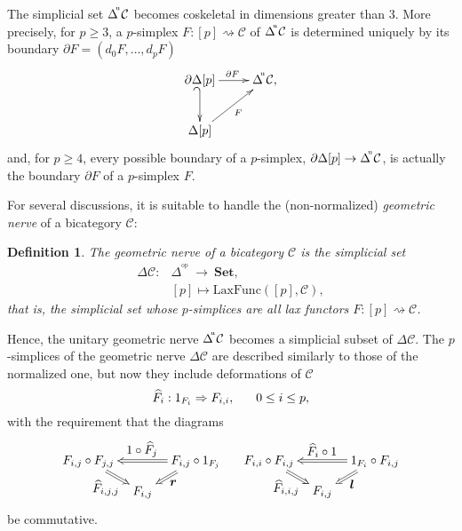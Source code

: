 \documentclass[]{amsart}
\newtheorem{definition}[theorem]{Definition}
\begin{document}
The simplicial set $\Delta^{\hspace{-2pt}^\mathrm{u}}{\ensuremath{\mathcal{C}}}$ becomes coskeletal in dimensions greater
than 3. More precisely, for $p\geq 3$, a $p$-simplex $F:[p]\rightsquigarrow {\ensuremath{\mathcal{C}}}$ of
$\Delta^{\hspace{-2pt}^\mathrm{u}}{\ensuremath{\mathcal{C}}}$ is determined uniquely by its boundary $\partial
F=(d_0F,\dots,d_pF)$
 $$\xymatrix{\partial\Delta[p]\ar[r]^{\partial F}\ar@{_{(}->}[d]&\Delta^{\hspace{-2pt}^\mathrm{u}}{\ensuremath{\mathcal{C}}},\\
\Delta[p]\ar[ru]_F&}$$
 and,  for $p\geq 4$, every possible boundary of a $p$-simplex, $\partial\Delta[p]\to \Delta^{\hspace{-2pt}^\mathrm{u}}{\ensuremath{\mathcal{C}}}$, is actually the boundary $\partial F$ of a $p$-simplex $F$.

 For several discussions, it is suitable to handle the (non-normalized) {\em geometric nerve} of a bicategory ${\ensuremath{\mathcal{C}}}$:
\begin{definition} The geometric nerve of a bicategory ${\ensuremath{\mathcal{C}}}$ is the simplicial set
\begin{equation}\label{gn} \begin{array}{ll}\Delta{\ensuremath{\mathcal{C}}}:&\Delta^{\!^{\mathrm{op}}}\ \to \ {\ensuremath{\mathbf{Set}}},\\[6pt]
&[p]\mapsto {\ensuremath{\mathrm{LaxFunc}}}([p],{\ensuremath{\mathcal{C}}}),\end{array}\end{equation} that is, the simplicial set whose
$p$-simplices are all lax functors ${F:[p]\rightsquigarrow {\ensuremath{\mathcal{C}}}}$.\end{definition}
  Hence, the unitary geometric nerve  $\Delta^{\hspace{-2pt}^\mathrm{u}}{\ensuremath{\mathcal{C}}}$ becomes a simplicial subset of $\Delta{\ensuremath{\mathcal{C}}}$.  The $p$-simplices of the  geometric nerve $\Delta{\ensuremath{\mathcal{C}}}$ are described similarly  to those of the normalized one, but now they include  deformations of
${\ensuremath{\mathcal{C}}}$ \begin{equation}\label{1.2.16'} \widehat{F}_i:1_{F_i}\Rightarrow F_{i,i},\hspace{0.6cm}0\leq
i\leq p, \end{equation} with the requirement that the diagrams
$$
\xymatrix@C=9pt@R=9pt{ F_{i,j}\circ F_{j,j}\ar@2{->}[dr]_{\textstyle \widehat{F}_{i,j,j}} &&
F_{i,j}\circ
1_{F_j}\ar@2{->}[dl]^{\textstyle \boldsymbol{r}}\ar@2{->}[ll]_{\textstyle 1\circ \widehat{F}_j}\\
& F_{i,j}&\\}  ~~~~ \xymatrix@C=9pt@R=9pt{ F_{i,i}\circ F_{i,j}\ar@2{->}[dr]_{\textstyle
\widehat{F}_{i,i,j}} &&\ar@2{->}[ll]_{\textstyle \widehat{F}_i\circ 1} 1_{F_i}\circ
F_{i,j}\ar@2{->}[dl]^{\textstyle \boldsymbol{l}}\\
& F_{i,j}&\\}
$$
be commutative.
\end{document}
